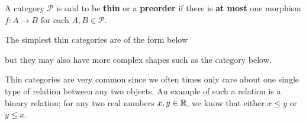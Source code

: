    \begin{definition}
        A category $\mathcal{P}$ is said to be \textbf{thin} or a \textbf{preorder}
        if there is \textbf{at most} one morphism $f:  A \to B$ for each $A, B \in \mathcal{P}$. 
    \end{definition}\label{definition:thin-category}
    The simplest thin categories are of the form below 
    \begin{center}
    \end{center}
    but they may also have more complex shapes such as the category below. 
    \begin{center}
    \end{center}
    Thin categories are very common since we often times only care about one single 
    type of relation between any two objects. An example of such a relation is a binary relation; 
    for any two real numbers $x, y \in \mathbb{R}$, we know that either $x \le y$ or $y \le x$. 

